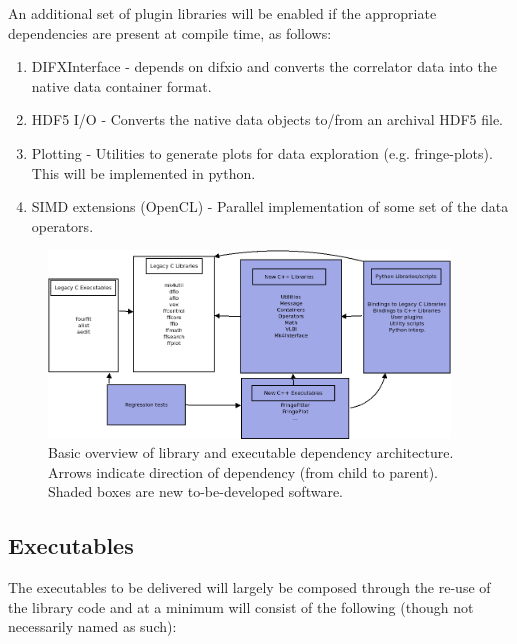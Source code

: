 \documentclass[hidelinks]{article}
\let\Oldsubsection\subsection
\renewcommand{\subsection}{\FloatBarrier\Oldsubsection}
\begin{document}
An additional set of plugin libraries will be enabled if the appropriate dependencies are present at compile time, as follows:

 \begin{enumerate}
    \item DIFXInterface - depends on difxio and converts the correlator data into the native data container format.
    \item HDF5 I/O - Converts the native data objects to/from an archival HDF5 file.
    \item Plotting - Utilities to generate plots for data exploration (e.g. fringe-plots). This will be implemented in python.
    \item SIMD extensions (OpenCL) - Parallel implementation of some set of the data operators.
 \end{enumerate}


\begin{figure}[h!]
\begin{center}
  \includegraphics[width=0.95\textwidth]{arch_overview.png}
    \caption{Basic overview of library and executable dependency architecture. Arrows indicate direction of dependency (from child to parent). Shaded boxes are new to-be-developed software.}
    \label{fig:lib-arch}
\end{center}
\end{figure}


\subsection{Executables}

The executables to be delivered will largely be composed through the re-use of the library code and at a minimum will consist of the following (though not necessarily
named as such):
\end{document}
